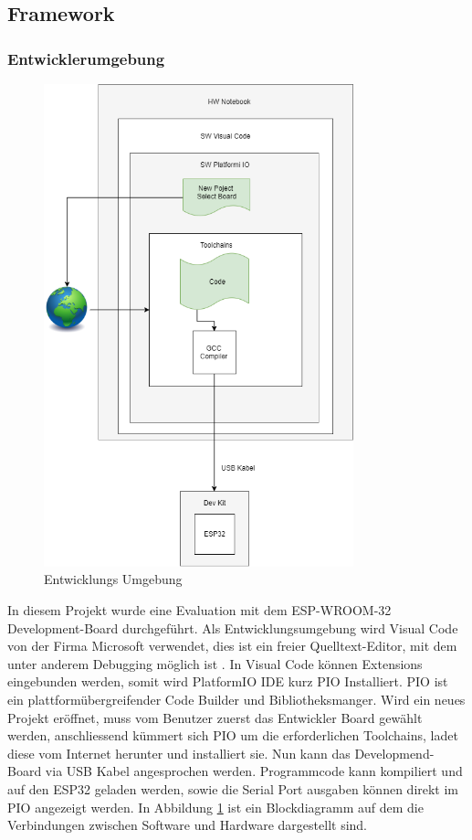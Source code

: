 \subsection{Framework}\label{subsec: Framework}

\subsubsection{Entwicklerumgebung} 
\begin{figure}[H]
	\centering
	\includegraphics[width=0.8\textwidth]{graphics/DevelopDiagram.png}
	\caption{Entwicklungs Umgebung}
	\label{pic: PIO}
\end{figure} 

In diesem Projekt wurde eine Evaluation mit dem ESP-WROOM-32 Development-Board durchgeführt. Als Entwicklungsumgebung wird Visual Code von der Firma Microsoft verwendet, dies ist ein freier Quelltext-Editor, mit dem unter anderem Debugging möglich ist \cite{noauthor_visual_nodate}. In Visual Code können Extensions eingebunden werden, somit wird PlatformIO IDE \cite{platformio_platformio_nodate} kurz PIO Installiert.
PIO ist ein plattformübergreifender Code Builder und Bibliotheksmanger. Wird ein neues Projekt eröffnet, muss vom Benutzer zuerst das Entwickler Board gewählt werden, anschliessend kümmert sich PIO um die erforderlichen Toolchains, ladet diese vom Internet herunter und installiert sie. Nun kann das Developmend-Board via USB Kabel angesprochen werden. Programmcode kann kompiliert und auf den ESP32 geladen werden, sowie die Serial Port ausgaben können direkt im PIO angezeigt werden. In Abbildung \ref{pic: PIO} ist ein Blockdiagramm auf dem die Verbindungen zwischen Software und Hardware dargestellt sind.

